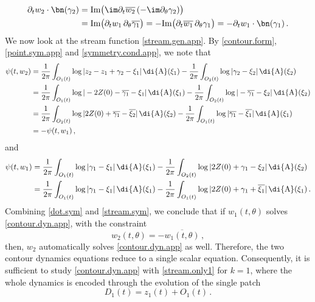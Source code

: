 \documentclass[a4paper,reqno,10pt]{article}
\newcommand{\pa}{\partial}
\newcommand{\wrta}{\,\di {\rm A}}
\begin{document}
   \begin{equation}\label{dot.sym}
   	\begin{aligned}
   		\pa_{t} w_2 \cdot \bn(\gamma_{2}) &= {\rm Im} \big( \im \pa_{t} \overline{w_2} \,(-\im \pa_{\theta} \gamma_{2}) \big) \\
   		&= {\rm Im} \big( \pa_{t} w_1 \,\pa_{\theta}\overline{\gamma_{1}} \big) = - {\rm Im} \big( \pa_{t} \overline{w_1} \, \pa_{\theta} \gamma_{1} \big) = -  \pa_{t} w_1 \cdot \bn(\gamma_{1}) \,.
    	\end{aligned}
   \end{equation}
   We now look at the stream function \eqref{stream.gen.app}. By \eqref{contour.form}, \eqref{point.sym.app} and \eqref{symmetry.cond.app}, we note that
      \begin{equation}\label{stream.sym}
   	\begin{aligned}
   		\psi(t,w_2) & = \frac{1}{2\pi} \int_{O_{1}(t)} \log | z_2 - z_{1} + \gamma_{2} -\xi_{1} | \wrta(\xi_{1})   - \frac{1}{2\pi} \int_{O_{2}(t)} \log | \gamma_{2}- \xi_{2} | \wrta(\xi_{2}) \\
   		& = \frac{1}{2\pi} \int_{O_{1}(t)} \log | -2Z(0)- \overline{\gamma_{1}} -\xi_{1} | \wrta(\xi_{1})  - \frac{1}{2\pi} \int_{O_{2}(t)} \log | -\overline{\gamma_{1}}- \xi_{2} | \wrta(\xi_{2}) \\
   		& = \frac{1}{2\pi} \int_{O_{2}(t)} \log | 2Z(0)+ \overline{\gamma_{1}} -\overline{\xi_{2}} | \wrta(\xi_{2})   - \frac{1}{2\pi} \int_{O_{1}(t)} \log | \overline{\gamma_{1}}- \overline{\xi_{1}} | \wrta(\xi_{1}) \\
   		& = - \psi(t,w_1)\,,
   	\end{aligned}
   \end{equation}
  and
   \begin{equation}\label{stream.only1}
   	\begin{aligned}
   			\psi(t,w_1) & = \frac{1}{2\pi} \int_{O_{1}(t)} \log |  \gamma_{1} -\xi_{1} | \wrta(\xi_{1})   - \frac{1}{2\pi} \int_{O_{2}(t)} \log | 2Z(0)+ \gamma_{1}- \xi_{2} | \wrta(\xi_{2}) \\
   			& = \frac{1}{2\pi} \int_{O_{1}(t)} \log |  \gamma_{1} -\xi_{1} | \wrta(\xi_{1})   - \frac{1}{2\pi} \int_{O_{1}(t)} \log | 2Z(0)+ \gamma_{1} +\overline{\xi_{1}} | \wrta(\xi_{1}) \,.
   	\end{aligned}
   \end{equation}
Combining \eqref{dot.sym} and \eqref{stream.sym}, we conclude that if $w_1(t,\theta)$ solves \eqref{contour.dyn.app}, with the constraint
$$
w_2(t,\theta)=-\overline{w_1(t,\theta)} \,,
$$
then, $w_2$ automatically solves \eqref{contour.dyn.app} as well. Therefore, the two contour dynamics equations reduce to a single scalar equation. Consequently, it is sufficient to study \eqref{contour.dyn.app} with \eqref{stream.only1} for $k=1$, where the whole dynamics is encoded through the evolution of the single patch
$$
D_1(t)=z_1(t)+O_1(t) \,.
$$
\end{document}
